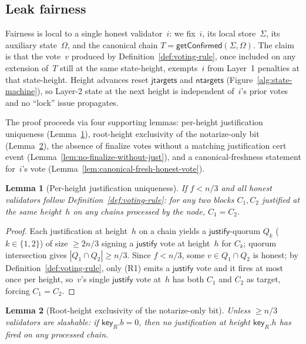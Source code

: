\ifx\litemode\undefined\documentclass{article}\fi
\newcommand{\just}{\ensuremath{\mathsf{justify}}\xspace}
\newcommand{\jtargets}{\mathsf{jtargets}}
\newcommand{\ntargets}{\mathsf{ntargets}}
\newcommand{\key}{\mathsf{key}}
\newcommand{\getConfirmed}{\textsf{getConfirmed}\xspace}
\theoremstyle{plain}
\newtheorem{lemma}{Lemma}
\theoremstyle{definition}
\theoremstyle{remark}
\begin{document}
\subsection{Leak fairness}

Fairness is local to a single honest validator~$i$: we fix~$i$, its local store~$\Sigma$, its auxiliary state~$\Omega$, and the canonical chain $T = \getConfirmed(\Sigma, \Omega)$.
The claim is that the vote~$v$ produced by Definition~\ref{def:voting-rule}, once included on any extension of~$T$ still at the same state-height, exempts~$i$ from Layer~1 penalties at that state-height.
Height advances reset $\jtargets$ and $\ntargets$ (Figure~\ref{alg:state-machine}), so Layer-2 state at the next height is independent of~$i$'s prior votes and no ``lock'' issue propagates.

The proof proceeds via four supporting lemmas: per-height justification uniqueness (Lemma~\ref{lem:just-unique-height}), root-height exclusivity of the notarize-only bit (Lemma~\ref{lem:root-h-notarize-only}), the absence of finalize votes without a matching justification cert event (Lemma~\ref{lem:no-finalize-without-just}), and a canonical-freshness statement for~$i$'s vote (Lemma~\ref{lem:canonical-fresh-honest-vote}).

\begin{lemma}[Per-height justification uniqueness]\label{lem:just-unique-height}
If $f < n/3$ and all honest validators follow Definition~\ref{def:voting-rule}: for any two blocks $C_1, C_2$ justified at the same height~$h$ on any chains processed by the node, $C_1 = C_2$.
\end{lemma}

\begin{proof}
Each justification at height~$h$ on a chain yields a \just-quorum $Q_k$ ($k \in \{1, 2\}$) of size $\geq 2n/3$ signing a \just vote at height~$h$ for $C_k$; quorum intersection gives $|Q_1 \cap Q_2| \geq n/3$.
Since $f < n/3$, some $v \in Q_1 \cap Q_2$ is honest; by Definition~\ref{def:voting-rule}, only (R1) emits a \just vote and it fires at most once per height, so~$v$'s single \just vote at~$h$ has both $C_1$ and $C_2$ as target, forcing $C_1 = C_2$.
\end{proof}

\begin{lemma}[Root-height exclusivity of the notarize-only bit]\label{lem:root-h-notarize-only}
Unless $\geq n/3$ validators are slashable: if $\key_R.b = 0$, then no justification at height $\key_R.h$ has fired on any processed chain.
\end{lemma}
\end{document}
